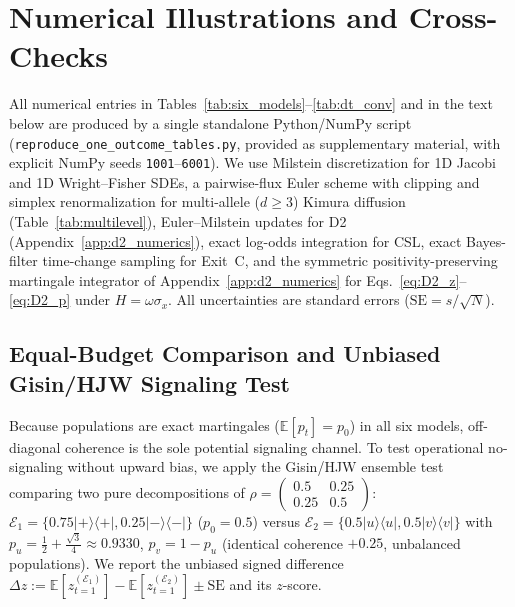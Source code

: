 \documentclass[aps,pra,10pt,twocolumn,superscriptaddress,amsmath,amssymb,floatfix]{revtex4-2}
\newcommand{\E}{\mathbb{E}}
\newcommand{\ketbra}[2]{|#1\rangle\langle #2|}
\begin{document}
\section{Numerical Illustrations and Cross-Checks}
\label{sec:numerics}

All numerical entries in Tables~\ref{tab:six_models}--\ref{tab:dt_conv} and in the text below are produced by a single standalone Python/NumPy script (\texttt{reproduce\_one\_outcome\_tables.py}, provided as supplementary material, with explicit NumPy seeds \texttt{1001}--\texttt{6001}). We use Milstein discretization for 1D Jacobi and 1D Wright--Fisher SDEs, a pairwise-flux Euler scheme with clipping and simplex renormalization for multi-allele ($d\ge 3$) Kimura diffusion (Table~\ref{tab:multilevel}), Euler--Milstein updates for D2 (Appendix~\ref{app:d2_numerics}), exact log-odds integration for CSL, exact Bayes-filter time-change sampling for Exit~C, and the symmetric positivity-preserving martingale integrator of Appendix~\ref{app:d2_numerics} for Eqs.~\eqref{eq:D2_z}--\eqref{eq:D2_p} under $H = \omega\sigma_x$. All uncertainties are standard errors ($\mathrm{SE} = s/\sqrt{N}$).

\subsection{Equal-Budget Comparison and Unbiased Gisin/HJW Signaling Test}

Because populations are exact martingales ($\E[p_t]=p_0$) in all six models, off-diagonal coherence is the sole potential signaling channel. To test operational no-signaling without upward bias, we apply the Gisin/HJW ensemble test~\cite{Gisin1989,HJW1993} comparing two pure decompositions of $\rho = \begin{pmatrix}0.5 & 0.25 \\ 0.25 & 0.5\end{pmatrix}$: $\mathcal{E}_1 = \{0.75\ketbra{+}{+}, 0.25\ketbra{-}{-}\}$ ($p_0=0.5$) versus $\mathcal{E}_2 = \{0.5\ketbra{u}{u}, 0.5\ketbra{v}{v}\}$ with $p_u = \frac{1}{2}+\frac{\sqrt{3}}{4} \approx 0.9330$, $p_v = 1-p_u$ (identical coherence $+0.25$, unbalanced populations). We report the unbiased signed difference $\Delta z := \E[z_{t=1}^{(\mathcal{E}_1)}] - \E[z_{t=1}^{(\mathcal{E}_2)}] \pm \mathrm{SE}$ and its $z$-score.
\end{document}
